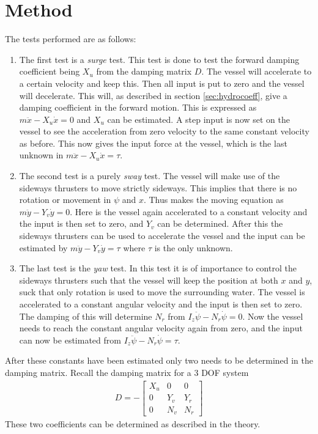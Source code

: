 \section{Method}
The tests performed are as follows:
\begin{enumerate}
	\item The first test is a \textit{surge} test. This test is done to test the forward damping coefficient being $X_u$ from the damping matrix $D$. The vessel will accelerate to a certain velocity and keep this. Then all input is put to zero and the vessel will decelerate. This will, as described in section \ref{sec:hydrocoeff}, give a damping coefficient in the forward motion. This is expressed as $m \ddot x - X_u \dot x = 0$ and $X_u$ can be estimated. A step input is now set on the vessel to see the acceleration from zero velocity to the same constant velocity as before. This now gives the input force at the vessel, which is the last unknown in $m \ddot x - X_u \dot x = \tau$.
	\item The second test is a purely \textit{sway} test. The vessel will make use of the sideways thrusters to move strictly sideways. This implies that there is no rotation or movement in $\psi$ and $x$. Thus makes the moving equation as $m \ddot y - Y_v \dot y = 0$. Here is the vessel again accelerated to a constant velocity and the input is then set to zero, and $Y_v$ can be determined. After this the sideways thrusters can be used to accelerate the vessel and the input can be estimated by $m \ddot y - Y_v \dot y = \tau$ where $\tau$ is the only unknown.
	\item The last test is the \textit{yaw} test. In this test it is of importance to control the sideways thrusters such that the vessel will keep the position at both $x$ and $y$, suck that only rotation is used to move the surrounding water. The vessel is accelerated to a constant angular velocity and the input is then set to zero. The damping of this will determine $N_r$ from $I_z\ddot \psi - N_r \dot \psi = 0$. Now the vessel needs to reach the constant angular velocity again from zero, and the input can now be estimated from $I_z\ddot \psi - N_r \dot \psi = \tau$.
\end{enumerate}
After these constants have been estimated only two needs to be determined in the damping matrix. Recall the damping matrix for a 3 \ac{DOF} system
\begin{align}
D = -
\begin{bmatrix}
X_u & 0 & 0\\
0 & Y_v & Y_r\\
0 & N_v & N_r
\end{bmatrix}
\end{align}
These two coefficients can be determined as described in the theory.

